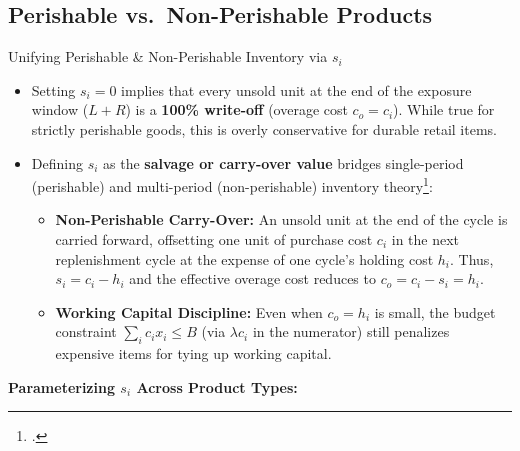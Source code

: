 \documentclass[11pt]{beamer}
\begin{document}
\subsection{Perishable vs.\ Non-Perishable Products}
\begin{frame}[allowframebreaks]{Unifying Perishable \& Non-Perishable Inventory via $s_i$}
\begin{small}
\begin{itemize}
\item Setting $s_i = 0$ implies that every unsold unit at the end of the exposure window ($L+R$) is a \textbf{100\% write-off} (overage cost $c_o = c_i$). While true for strictly perishable goods, this is overly conservative for durable retail items.
\item Defining $s_i$ as the \textbf{salvage or carry-over value} bridges single-period (perishable) and multi-period (non-perishable) inventory theory\footcite[See][for multi-period base-stock equivalence]{snyder2019}:
\begin{itemize}
\item \textbf{Non-Perishable Carry-Over:} An unsold unit at the end of the cycle is carried forward, offsetting one unit of purchase cost $c_i$ in the next replenishment cycle at the expense of one cycle's holding cost $h_i$. Thus, $s_i = c_i - h_i$ and the effective overage cost reduces to $c_o = c_i - s_i = h_i$.
\item \textbf{Working Capital Discipline:} Even when $c_o = h_i$ is small, the budget constraint $\sum_i c_i x_i \leq B$ (via $\lambda c_i$ in the numerator) still penalizes expensive items for tying up working capital.
\end{itemize}
\end{itemize}
\end{small}

\framebreak
\begin{scriptsize}
\textbf{Parameterizing $s_i$ Across Product Types:}
\vspace{0.1em}


\end{scriptsize}
\end{frame}
\end{document}
